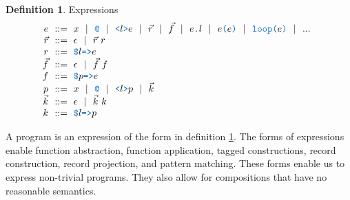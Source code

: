 \documentclass[acmsmall]{acmart}
\theoremstyle{definition}
\newtheorem{definition}{Definition}[section]
\begin{document}
\begin{definition} Expressions
  \label{def:expressions}
  \[\begin{array}[t]{r@{}l}
    \nonterm{e} 
    & 
    \is 
    \begin{array}[t]{@{}l}
      x \sep 
      \obj{@} \sep
      \obj{<}l\obj{>}e \sep 
      \vec{r} \sep
      \vec{f} \sep 
      e\obj{.}l \sep
      e\obj{(}e\obj{)} \sep
      \obj{loop(}e\obj{)} \sep
      ...
    \end{array}
    \\
    \nonterm{\vec{r}} & \is \epsilon \sep \vec{r}\ r 
    \\
    \nonterm{r} & \is \obj{\$}l\obj{=>}e
    \\
    \nonterm{\vec{f}} & \is \epsilon \sep \vec{f}\ f
    \\
    \nonterm{f} & \is \obj{\$}p\obj{=>}e
    \\
    \nonterm{p} & \is 
      x \sep
      \obj{@} \sep
      \obj{<}l\obj{>}p \sep
      \vec{k}
    \\
    \nonterm{\vec{k}} & \is \epsilon \sep \vec{k}\ k
    \\
    \nonterm{k} & \is \obj{\$}l\obj{=>}p
  \end{array}\]
\end{definition}

A program is an expression 
of the form in definition \ref{def:expressions}. The forms of expressions
enable function abstraction, function application, tagged constructions, record construction, record projection,
and pattern matching. These forms enable us to express non-trivial programs. They also allow
for compositions that have no reasonable semantics.  
\end{document}
